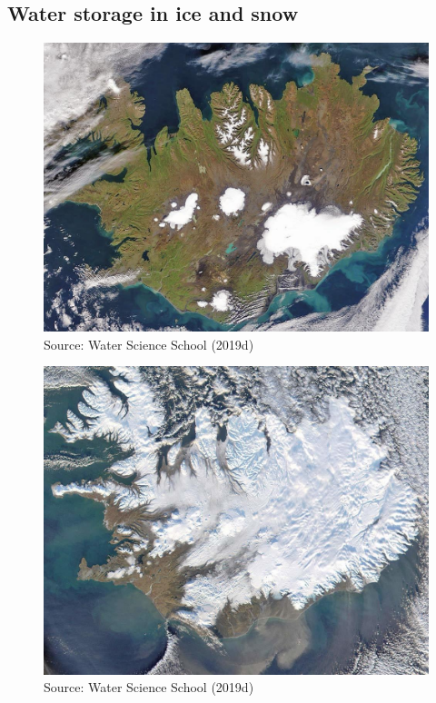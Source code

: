 \documentclass[
  letterpaper,
  DIV=11,
  numbers=noendperiod]{scrreprt}
\begin{document}
\hypertarget{water-storage-in-ice-and-snow}{%
\subsection{Water storage in ice and
snow}\label{water-storage-in-ice-and-snow}}

\begin{figure}

{\centering \includegraphics{archive/figures/iceland-summer.jpg}

}

\caption{Source: Water Science School (2019d)}

\end{figure}

\begin{figure}

{\centering \includegraphics{archive/figures/iceland-winter.jpg}

}

\caption{Source: Water Science School (2019d)}

\end{figure}
\end{document}
